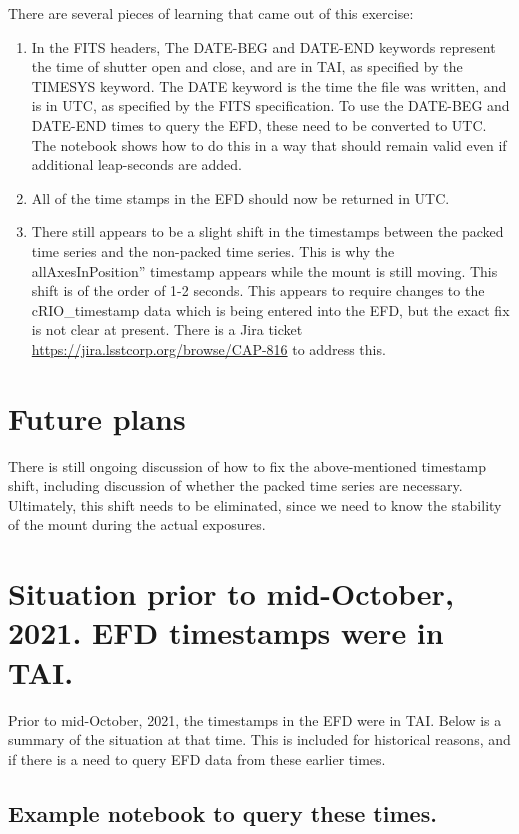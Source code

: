 \documentclass[SE,authoryear,toc]{lsstdoc}
\begin{document}
There are several pieces of learning that came out of this exercise:
\begin{enumerate}
  \item In the FITS headers, The DATE-BEG and DATE-END keywords represent the time of shutter open and close, and are in TAI, as specified by the TIMESYS keyword.  The DATE keyword is the time the file was written, and is in UTC, as specified by the FITS specification.  To use the DATE-BEG and DATE-END times to query the EFD, these need to be converted to UTC.  The notebook shows how to do this in a way that should remain valid even if additional leap-seconds are added.
  \item All of the time stamps in the EFD should now be returned in UTC.
  \item There still appears to be a slight shift in the timestamps between the packed time series and the non-packed time series.  This is why the allAxesInPosition'' timestamp appears while the mount is still moving.  This shift is of the order of 1-2 seconds.  This appears to require changes to the cRIO\_timestamp data which is being entered into the EFD, but the exact fix is not clear at present.  There is a Jira ticket \url{https://jira.lsstcorp.org/browse/CAP-816} to address this.
\end{enumerate}

\section{Future plans}

There is still ongoing discussion of how to fix the above-mentioned timestamp shift, including discussion of whether the packed time series are necessary.  Ultimately, this shift needs to be eliminated, since we need to know the stability of the mount during the actual exposures.

\section{Situation prior to mid-October, 2021.  EFD timestamps were in TAI.}
Prior to mid-October, 2021, the timestamps in the EFD were in TAI.  Below is a summary of the situation at that time.  This is included for historical reasons, and if there is a need to query EFD data from these earlier times.
\subsection{Example notebook to query these times.}
\end{document}

